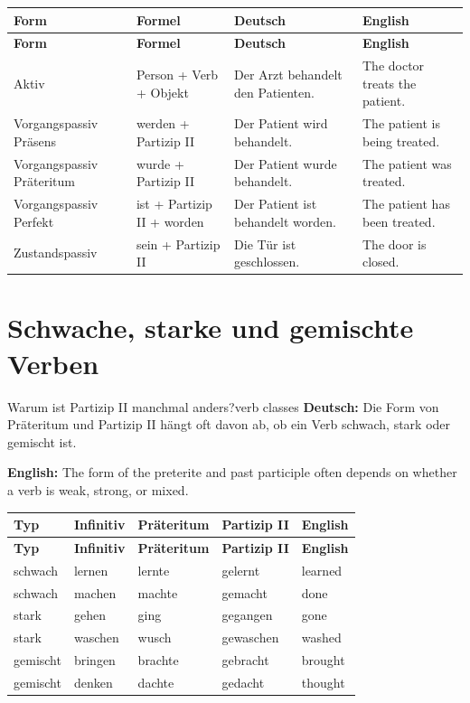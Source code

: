 \documentclass[a4paper,11pt]{article}
\newcommand{\GermanText}[1]{\textbf{Deutsch: }#1\par}
\newcommand{\EnglishText}[1]{{\small\color{SoftGray}\textbf{English: }#1\par}}
\begin{document}
\begin{longtable}{L{3.2cm}L{4.8cm}L{4.8cm}L{3.6cm}}
\color{white}\textbf{Form} & \color{white}\textbf{Formel} & \color{white}\textbf{Deutsch} & \color{white}\textbf{English} \\
\endfirsthead
{}
\color{white}\textbf{Form} & \color{white}\textbf{Formel} & \color{white}\textbf{Deutsch} & \color{white}\textbf{English} \\
\endhead
Aktiv & Person + Verb + Objekt & Der Arzt behandelt den Patienten. & The doctor treats the patient. \\
Vorgangspassiv Präsens & werden + Partizip II & Der Patient wird behandelt. & The patient is being treated. \\
Vorgangspassiv Präteritum & wurde + Partizip II & Der Patient wurde behandelt. & The patient was treated. \\
Vorgangspassiv Perfekt & ist + Partizip II + worden & Der Patient ist behandelt worden. & The patient has been treated. \\
Zustandspassiv & sein + Partizip II & Die Tür ist geschlossen. & The door is closed. \\
\end{longtable}

\section{Schwache, starke und gemischte Verben}

\begin{grammarentry}{Warum ist Partizip II manchmal anders?}{verb classes}
\GermanText{Die Form von Präteritum und Partizip II hängt oft davon ab, ob ein Verb schwach, stark oder gemischt ist.}
\EnglishText{The form of the preterite and past participle often depends on whether a verb is weak, strong, or mixed.}
\end{grammarentry}

\begin{longtable}{L{3cm}L{3cm}L{3.3cm}L{3.3cm}L{3cm}}
\color{white}\textbf{Typ} & \color{white}\textbf{Infinitiv} & \color{white}\textbf{Präteritum} & \color{white}\textbf{Partizip II} & \color{white}\textbf{English} \\
\endfirsthead
{}
\color{white}\textbf{Typ} & \color{white}\textbf{Infinitiv} & \color{white}\textbf{Präteritum} & \color{white}\textbf{Partizip II} & \color{white}\textbf{English} \\
\endhead
schwach & lernen & lernte & gelernt & learned \\
schwach & machen & machte & gemacht & done \\
stark & gehen & ging & gegangen & gone \\
stark & waschen & wusch & gewaschen & washed \\
gemischt & bringen & brachte & gebracht & brought \\
gemischt & denken & dachte & gedacht & thought \\
\end{longtable}
\end{document}
